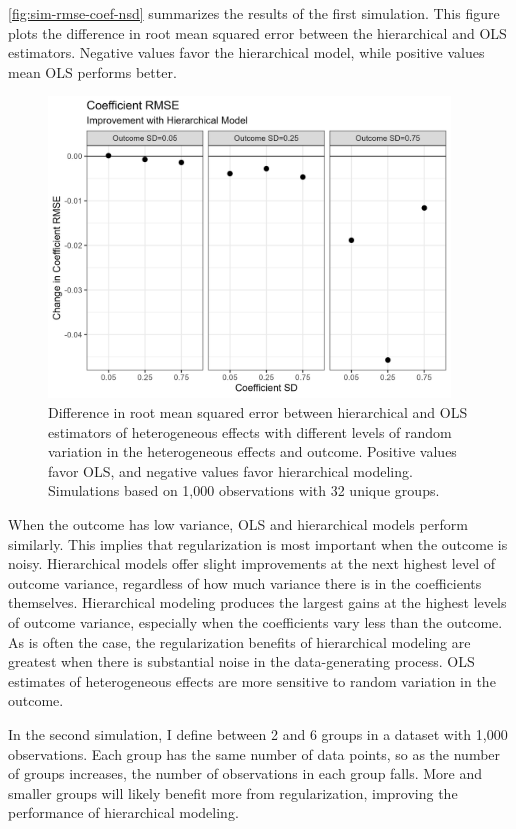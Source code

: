 \documentclass[12pt]{article}
\begin{document}
\autoref{fig:sim-rmse-coef-nsd} summarizes the results of the first simulation.
This figure plots the difference in root mean squared error between the hierarchical and OLS estimators. 
Negative values favor the hierarchical model, while positive values mean OLS performs better.


\begin{figure}[htpb]
	\centering
		\includegraphics[width=0.95\textwidth]{../figures/sim-rmse-coef-nsd.png}
	\caption{Difference in root mean squared error between hierarchical and OLS estimators of heterogeneous effects with different levels of random variation in the heterogeneous effects and outcome. Positive values favor OLS, and negative values favor hierarchical modeling. Simulations based on 1,000 observations with 32 unique groups.}
	\label{fig:sim-rmse-coef-nsd}
\end{figure}


When the outcome has low variance, OLS and hierarchical models perform similarly. 
This implies that regularization is most important when the outcome is noisy. 
Hierarchical models offer slight improvements at the next highest level of outcome variance, regardless of how much variance there is in the coefficients themselves. 
Hierarchical modeling produces the largest gains at the highest levels of outcome variance, especially when the coefficients vary less than the outcome.
As is often the case, the regularization benefits of hierarchical modeling are greatest when there is substantial noise in the data-generating process. 
OLS estimates of heterogeneous effects are more sensitive to random variation in the outcome.


In the second simulation, I define between 2 and 6 groups in a dataset with 1,000 observations.
Each group has the same number of data points, so as the number of groups increases, the number of observations in each group falls. 
More and smaller groups will likely benefit more from regularization, improving the performance of hierarchical modeling.
\end{document}
